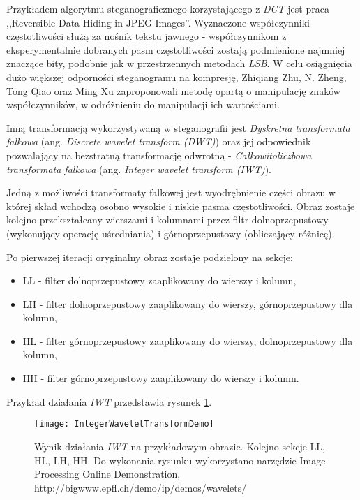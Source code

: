 {{{            %
            Przykładem algorytmu steganograficznego korzystającego z \textit{DCT} jest praca ,,Reversible Data Hiding in
            JPEG Images''\cite{Huang2016ReversibleDH, Li2007ASM}. Wyznaczone współczynniki częstotliwości służą za
            nośnik tekstu jawnego - współczynnikom z eksperymentalnie dobranych pasm częstotliwości zostają podmienione
            najmniej znaczące bity, podobnie jak w przestrzennych metodach \textit{LSB}. W celu osiągnięcia dużo
            większej odporności steganogramu na kompresję, Zhiqiang Zhu, N. Zheng, Tong Qiao oraz Ming Xu zaproponowali
            metodę opartą o manipulację znaków współczynników, w odróżnieniu do manipulacji ich
            wartościami\cite{Zhu2019RobustSB}.

            Inną transformacją wykorzystywaną w steganografii jest \textit{Dyskretna transformata falkowa} (ang.
            \textit{Discrete wavelet transform (DWT)}) oraz jej odpowiednik pozwalający na bezstratną transformację
            odwrotną - \textit{Całkowitoliczbowa transformata falkowa} (ang. \textit{Integer wavelet transform
            (IWT)})\cite{Xuan2005LosslessDH}.
            
            Jedną z możliwości transformaty falkowej jest wyodrębnienie części obrazu w której skład wchodzą osobno
            wysokie i niskie pasma częstotliwości. Obraz zostaje kolejno przekształcany wierszami i kolumnami przez
            filtr dolnoprzepustowy (wykonujący operację uśredniania) i górnoprzepustowy (obliczający różnicę).
            
            Po pierwszej iteracji oryginalny obraz zostaje podzielony na sekcje:
            \begin{itemize}
                \item LL - filter dolnoprzepustowy zaaplikowany do wierszy i kolumn,
                \item LH - filter dolnoprzepustowy zaaplikowany do wierszy, górnoprzepustowy dla kolumn,
                \item HL - filter górnoprzepustowy zaaplikowany do wierszy, dolnoprzepustowy dla kolumn,
                \item HH - filter górnoprzepustowy zaaplikowany do wierszy i kolumn.
            \end{itemize}

            Przykład działania \textit{IWT} przedstawia rysunek \ref{fig:iwtdemo}.

            \begin{figure}
                \centering
                \texttt{[image: IntegerWaveletTransformDemo]}
                \caption{Wynik działania \textit{IWT} na przykładowym obrazie. Kolejno sekcje LL, HL, LH, HH. Do wykonania
                    rysunku wykorzystano narzędzie Image Processing Online Demonstration,
                    http://bigwww.epfl.ch/demo/ip/demos/wavelets/}
                \label{fig:iwtdemo}
            \end{figure}
            

}}}
